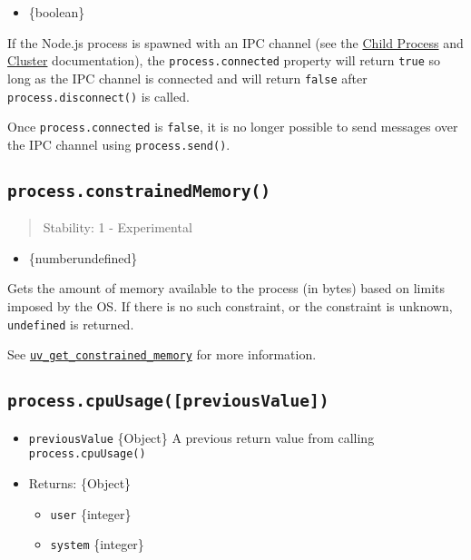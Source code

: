 \begin{itemize}
\tightlist
\item
  \{boolean\}
\end{itemize}

If the Node.js process is spawned with an IPC channel (see the
\href{child_process.md}{Child Process} and \href{cluster.md}{Cluster}
documentation), the \texttt{process.connected} property will return
\texttt{true} so long as the IPC channel is connected and will return
\texttt{false} after \texttt{process.disconnect()} is called.

Once \texttt{process.connected} is \texttt{false}, it is no longer
possible to send messages over the IPC channel using
\texttt{process.send()}.

\subsection{\texorpdfstring{\texttt{process.constrainedMemory()}}{process.constrainedMemory()}}\label{process.constrainedmemory}

\begin{quote}
Stability: 1 - Experimental
\end{quote}

\begin{itemize}
\tightlist
\item
  \{number\textbar undefined\}
\end{itemize}

Gets the amount of memory available to the process (in bytes) based on
limits imposed by the OS. If there is no such constraint, or the
constraint is unknown, \texttt{undefined} is returned.

See
\href{https://docs.libuv.org/en/v1.x/misc.html\#c.uv_get_constrained_memory}{\texttt{uv\_get\_constrained\_memory}}
for more information.

\subsection{\texorpdfstring{\texttt{process.cpuUsage({[}previousValue{]})}}{process.cpuUsage({[}previousValue{]})}}\label{process.cpuusagepreviousvalue}

\begin{itemize}
\tightlist
\item
  \texttt{previousValue} \{Object\} A previous return value from calling
  \texttt{process.cpuUsage()}
\item
  Returns: \{Object\}

  \begin{itemize}
  \tightlist
  \item
    \texttt{user} \{integer\}
  \item
    \texttt{system} \{integer\}
  \end{itemize}
\end{itemize}

